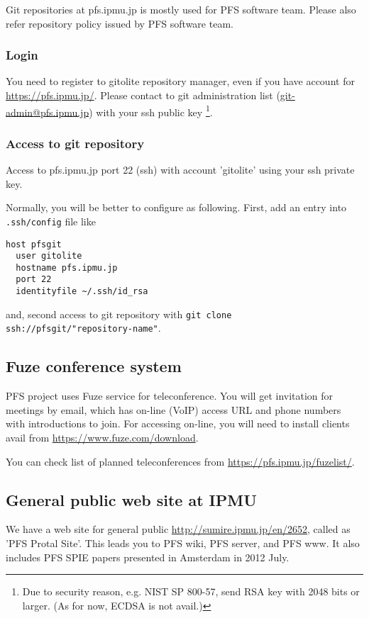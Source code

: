 \documentclass[a4paper,notitlepage]{article}
\begin{document}
Git repositories at pfs.ipmu.jp is mostly used for PFS software team.
Please also refer repository policy issued by PFS software team. 


\subsubsection{Login}

You need to register to gitolite repository manager, even if you have account 
for \url{https://pfs.ipmu.jp/}. Please contact to git administration list 
(\url{git-admin@pfs.ipmu.jp}) with your ssh public key
\footnote{Due to security reason, e.g. NIST SP 800-57, send RSA key with 
2048 bits or larger. (As for now, ECDSA is not avail.)}.

\subsubsection{Access to git repository}

Access to pfs.ipmu.jp port 22 (ssh) with account 'gitolite' 
using your ssh private key. 

Normally, you will be better to configure as following. 
First, add an entry into {\tt .ssh/config} file like 

\begin{verbatim}
host pfsgit
  user gitolite
  hostname pfs.ipmu.jp
  port 22
  identityfile ~/.ssh/id_rsa
\end{verbatim}

and, second access to git repository with 
{\tt git clone ssh://pfsgit/"repository-name"}.

\subsection{Fuze conference system}
\label{sec:pfs-fuze}

PFS project uses Fuze service for teleconference. 
You will get invitation for meetings by email, which has on-line (VoIP) 
access URL and phone numbers with introductions to join. 
For accessing on-line, you will need to install clients avail from 
\url{https://www.fuze.com/download}. 

You can check list of planned teleconferences from 
\url{https://pfs.ipmu.jp/fuzelist/}. 

\subsection{General public web site at IPMU}

We have a web site for general public \url{http://sumire.ipmu.jp/en/2652}, 
called as 'PFS Protal Site'.
This leads you to PFS wiki, PFS server, and PFS www.
It also includes PFS SPIE papers presented in Amsterdam in 2012 July.
\end{document}
